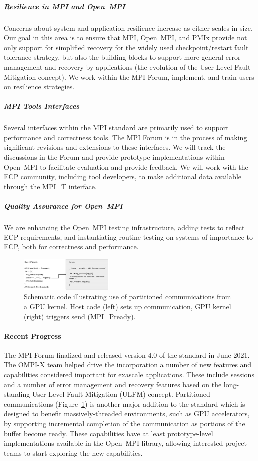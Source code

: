 \subparagraph{Resilience in MPI and Open~MPI} Concerns about system and
application resilience increase as either scales in size.  Our goal in
this area is to ensure that MPI, Open~MPI, and PMIx provide not only
support for simplified
recovery for the widely used checkpoint/restart fault tolerance strategy, but also the building
blocks to support more general error management and recovery by applications (the evolution of the User-Level
Fault Mitigation concept). We work within the MPI Forum, implement,
and train users on resilience strategies.

\subparagraph{MPI Tools Interfaces}  Several interfaces within the
MPI standard are primarily used to support performance and
correctness tools.
The MPI Forum is in the process
of making significant revisions and extensions to these interfaces.
We will track the discussions in the Forum and provide prototype
implementations within Open~MPI to facilitate evaluation and provide
feedback.
We will work with the
ECP community, including tool developers, to make additional data
available through the MPI\_T interface.

\subparagraph{Quality Assurance for Open~MPI}  We are enhancing the
Open~MPI testing infrastructure, adding tests to reflect ECP
requirements, and instantiating routine testing on systems of
importance to ECP, both for correctness and performance.

\begin{figure}
    \includegraphics[width=0.40\textwidth]{projects/2.3.1-PMR/2.3.1.17-OMPI-X/partitioned-comms-code.jpg}
    \caption{Schematic code illustrating use of partitioned communications from a GPU kernel.  
    Host code (left) sets up communication, GPU kernel (right) triggers send (MPI\_Pready).}
    \label{fig:partitioned-communications}
\end{figure}

\paragraph{Recent Progress}
The MPI Forum finalized and released version 4.0 of the standard in June 2021.  The OMPI-X team helped drive
the incorporation a number of new features and capabilities considered important for exascale applications.
These include sessions and a number of error management and recovery features
based on the long-standing User-Level Fault Mitigation (ULFM) concept.  Partitioned communications (Figure~\ref{fig:partitioned-communications})
is another major addition to the standard which is designed to benefit massively-threaded environments, such as GPU accelerators, by supporting
incremental completion of the communication as portions of the buffer become ready.
These capabilities have at least prototype-level implementations available in the Open~MPI library, allowing interested project teams to start
exploring the new capabilities.  

